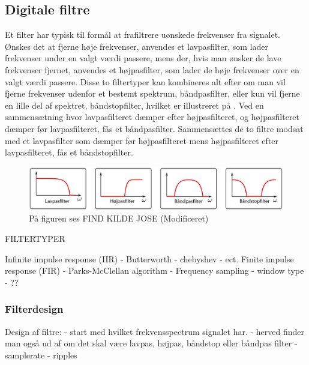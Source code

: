 \subsection{Digitale filtre}


Et filter har typisk til formål at frafiltrere uønskede frekvenser fra signalet. Ønskes det at fjerne høje frekvenser, anvendes et lavpasfilter, som lader frekvenser under en valgt værdi passere, mens der, hvis man ønsker de lave frekvenser fjernet, anvendes et højpasfilter, som lader de høje frekvenser over en valgt værdi passere. Disse to filtertyper kan kombineres alt efter om man vil fjerne frekvenser udenfor et bestemt spektrum, båndpasfilter, eller kun vil fjerne en lille del af spektret, båndstopfilter, hvilket er illustreret på . Ved en sammensætning hvor lavpasfilteret dæmper efter højpasfilteret, og højpasfilteret dæmper før lavpasfilteret, fås et båndpasfilter. Sammensættes de to filtre modsat med et lavpasfilter som dæmper før højpasfilteret mens højpasfilteret efter lavpasfilteret, fås et båndstopfilter.

\begin{figure}[H]
	\centering
	\includegraphics[scale=0.2]{figures/bProblemloesning/filtre.png}
	\caption{På figuren ses FIND KILDE JOSE (Modificeret)}
	\label{fig:filtre}
\end{figure}

FILTERTYPER

Infinite impulse response (IIR)
- Butterworth
- chebyshev 
- ect. 
Finite impulse response (FIR)
- Parks-McClellan algorithm
- Frequency sampling
- window type
- ??




\subsubsection{Filterdesign}


Design af filtre: 
- start med hvilket frekvensspectrum signalet har.
- herved finder man også ud af om det skal være lavpas, højpas, båndstop eller båndpas filter
- samplerate
- ripples


